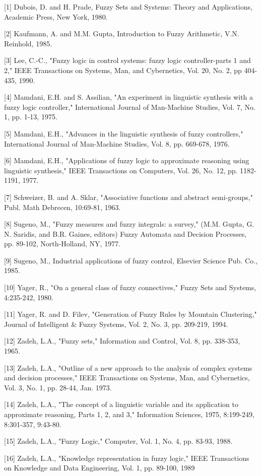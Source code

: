 [1] Dubois, D. and H. Prade, Fuzzy Sets and Systems: Theory and Applications, Academic Press, New York, 1980.

[2] Kaufmann, A. and M.M. Gupta, Introduction to Fuzzy Arithmetic, V.N. Reinhold, 1985.

[3] Lee, C.-C., "Fuzzy logic in control systems: fuzzy logic controller-parts 1 and 2," IEEE Transactions on Systems, Man, and Cybernetics, Vol. 20, No. 2, pp 404-435, 1990.

[4] Mamdani, E.H. and S. Assilian, "An experiment in linguistic synthesis with a fuzzy logic controller," International Journal of Man-Machine Studies, Vol. 7, No. 1, pp. 1-13, 1975.

[5] Mamdani, E.H., "Advances in the linguistic synthesis of fuzzy controllers," International Journal of Man-Machine Studies, Vol. 8, pp. 669-678, 1976.

[6] Mamdani, E.H., "Applications of fuzzy logic to approximate reasoning using linguistic synthesis," IEEE Transactions on Computers, Vol. 26, No. 12, pp. 1182-1191, 1977.

[7] Schweizer, B. and A. Sklar, "Associative functions and abstract semi-groups," Publ. Math Debrecen, 10:69-81, 1963.

[8] Sugeno, M., "Fuzzy measures and fuzzy integrals: a survey," (M.M. Gupta, G. N. Saridis, and B.R. Gaines, editors) Fuzzy Automata and Decision Processes, pp. 89-102, North-Holland, NY, 1977.

[9] Sugeno, M., Industrial applications of fuzzy control, Elsevier Science Pub. Co., 1985.

[10] Yager, R., "On a general class of fuzzy connectives," Fuzzy Sets and Systems, 4:235-242, 1980.

[11] Yager, R. and D. Filev, "Generation of Fuzzy Rules by Mountain Clustering," Journal of Intelligent & Fuzzy Systems, Vol. 2, No. 3, pp. 209-219, 1994.

[12] Zadeh, L.A., "Fuzzy sets," Information and Control, Vol. 8, pp. 338-353, 1965.

[13] Zadeh, L.A., "Outline of a new approach to the analysis of complex systems and decision processes," IEEE Transactions on Systems, Man, and Cybernetics, Vol. 3, No. 1, pp. 28-44, Jan. 1973.

[14] Zadeh, L.A., "The concept of a linguistic variable and its application to approximate reasoning, Parts 1, 2, and 3," Information Sciences, 1975, 8:199-249, 8:301-357, 9:43-80.

[15] Zadeh, L.A., "Fuzzy Logic," Computer, Vol. 1, No. 4, pp. 83-93, 1988.

[16] Zadeh, L.A., "Knowledge representation in fuzzy logic," IEEE Transactions on Knowledge and Data Engineering, Vol. 1, pp. 89-100, 1989